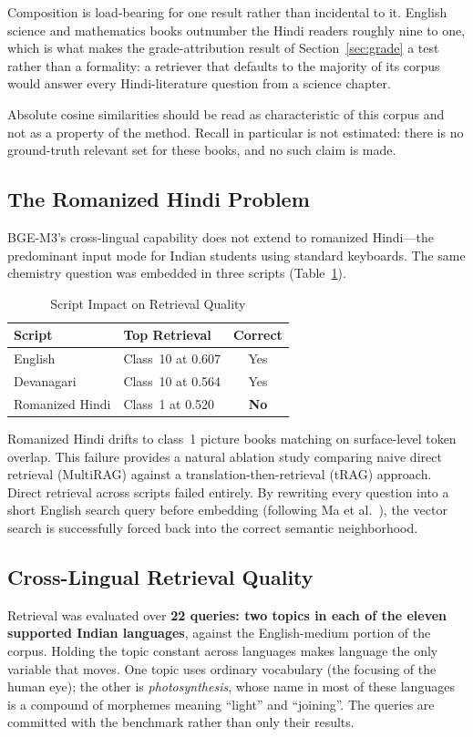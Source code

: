 \documentclass[conference]{IEEEtran}
\begin{document}
Composition is load-bearing for one result rather than incidental to it. English science and mathematics books outnumber the Hindi readers roughly nine to one, which is what makes the grade-attribution result of Section~\ref{sec:grade} a test rather than a formality: a retriever that defaults to the majority of its corpus would answer every Hindi-literature question from a science chapter.

Absolute cosine similarities should be read as characteristic of this corpus and not as a property of the method. Recall in particular is not estimated: there is no ground-truth relevant set for these books, and no such claim is made.

\subsection{The Romanized Hindi Problem}
\label{sec:romanized}
BGE-M3's cross-lingual capability does not extend to romanized Hindi---the predominant input mode for Indian students using standard keyboards. The same chemistry question was embedded in three scripts (Table~\ref{tab:scripts}).

\begin{table}[htbp]
\caption{Script Impact on Retrieval Quality}
\label{tab:scripts}
\centering
\begin{tabular}{@{}llc@{}}
\toprule
\textbf{Script} & \textbf{Top Retrieval} & \textbf{Correct} \\
\midrule
English & Class~10 at 0.607 & Yes \\
Devanagari & Class~10 at 0.564 & Yes \\
Romanized Hindi & Class~1 at 0.520 & \textbf{No} \\
\bottomrule
\end{tabular}
\end{table}

Romanized Hindi drifts to class~1 picture books matching on surface-level token overlap. This failure provides a natural ablation study comparing naive direct retrieval (MultiRAG) against a translation-then-retrieval (tRAG) approach. Direct retrieval across scripts failed entirely. By rewriting every question into a short English search query before embedding (following Ma et al.~\cite{b4}), the vector search is successfully forced back into the correct semantic neighborhood.

\subsection{Cross-Lingual Retrieval Quality}
\label{sec:crossling}
Retrieval was evaluated over \textbf{22 queries: two topics in each of the eleven supported Indian languages}, against the English-medium portion of the corpus. Holding the topic constant across languages makes language the only variable that moves. One topic uses ordinary vocabulary (the focusing of the human eye); the other is \emph{photosynthesis}, whose name in most of these languages is a compound of morphemes meaning ``light'' and ``joining''. The queries are committed with the benchmark rather than only their results.
\end{document}
